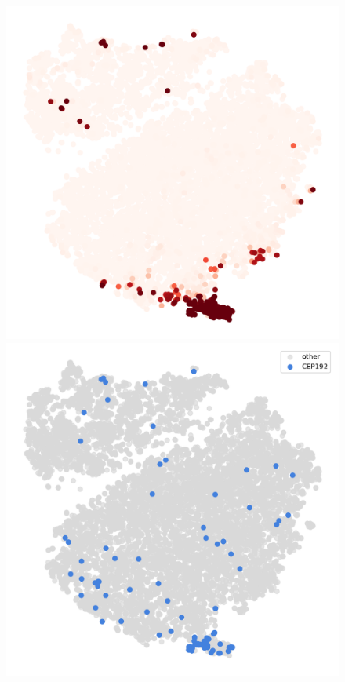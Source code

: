 \begin{figure}[h]
	\endminipage\hfill
		\includegraphics[width=\linewidth]{figures/appendix/tsne_probability_nocolorbar_intranuclear}
		\vfill
		\includegraphics[width=\linewidth]{figures/appendix/tsne_intranuclear_CEP192}

\end{figure}
